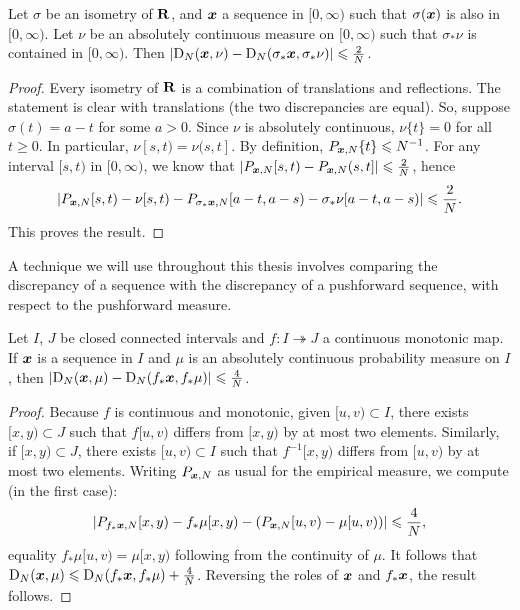 \begin{lemma}\label{lem:flip-discrepancy}
Let $\sigma$ be an isometry of $\mathbf{R}$, and ${\boldsymbol x}$ a sequence in $[0,\infty)$ 
such that $\sigma({\boldsymbol x})$ is also in $[0,\infty)$. Let $\nu$ be an absolutely 
continuous measure on $[0,\infty)$ such that $\sigma_\ast \nu$ is contained in 
$[0,\infty)$. Then 
$\left|\operatorname{D}_N({\boldsymbol x}, \nu) - \operatorname{D}_N(\sigma_\ast {\boldsymbol x}, \sigma_\ast \nu)\right| \leqslant \frac{2}{N}$. 
\end{lemma}
\begin{proof}
Every isometry of $\mathbf{R}$ is a combination of translations and reflections. 
The statement is clear with translations (the two discrepancies are equal). So, 
suppose $\sigma(t) = a - t$ for some $a>0$. Since $\nu$ is absolutely 
continuous, $\nu\{t\}=0$ for all $t\geqslant 0$. In particular, 
$\nu[s,t) = \nu(s,t]$. By definition, $P_{{\boldsymbol x},N}\{t\}\leqslant N^{-1}$. For 
any interval $[s,t)$ in $[0,\infty)$, we know that 
$\left| P_{{\boldsymbol x},N}[s,t) - P_{{\boldsymbol x},N}(s,t]\right| \leqslant \frac{2}{N}$, hence 
\[
	\left| P_{{\boldsymbol x},N}[s,t) - \nu[s,t) - P_{\sigma_\ast {\boldsymbol x},N}[a-t,a-s) - \sigma_\ast \nu[a-t,a-s)\right| \leqslant \frac{2}{N} .
\]
This proves the result. 
\end{proof}

A technique we will use throughout this thesis involves comparing the 
discrepancy of a sequence with the discrepancy of a pushforward sequence, 
with respect to the pushforward measure. 

\begin{lemma}\label{lem:push-discrepancy}
Let $I$, $J$ be closed connected intervals and $f\colon I\twoheadrightarrow J$ 
a continuous monotonic map. If ${\boldsymbol x}$ is a sequence in $I$ and $\mu$ is an 
absolutely continuous probability measure on $I$, then 
$\left|\operatorname{D}_N({\boldsymbol x},\mu) - \operatorname{D}_N(f_\ast {\boldsymbol x},f_\ast\mu)\right| \leqslant \frac 4 N$.
\end{lemma}
\begin{proof}
Because $f$ is continuous and monotonic, given $[u,v)\subset I$, there exists 
$[x,y)\subset J$ such that $f[u,v)$ differs from $[x,y)$ by at most two 
elements. Similarly, if $[x,y)\subset J$, there exists $[u,v)\subset I$ such 
that $f^{-1}[x,y)$ differs from $[u,v)$ by at most two elements. Writing 
$P_{{\boldsymbol x},N}$ as usual for the empirical measure, we compute (in the first 
case):
\[
	\left| P_{f_\ast{\boldsymbol x},N}[x,y) - f_\ast\mu[x,y) - \left(P_{{\boldsymbol x},N}[u,v) - \mu[u,v)\right)\right| \leqslant \frac 4 N ,
\]
equality $f_\ast\mu[u,v) = \mu[x,y)$ following from the continuity of $\mu$. 
It follows that 
$\operatorname{D}_N({\boldsymbol x},\mu) \leqslant \operatorname{D}_N(f_\ast {\boldsymbol x},f_\ast\mu) + \frac 4 N$. Reversing 
the roles of ${\boldsymbol x}$ and $f_\ast {\boldsymbol x}$, the result follows. 
\end{proof}

